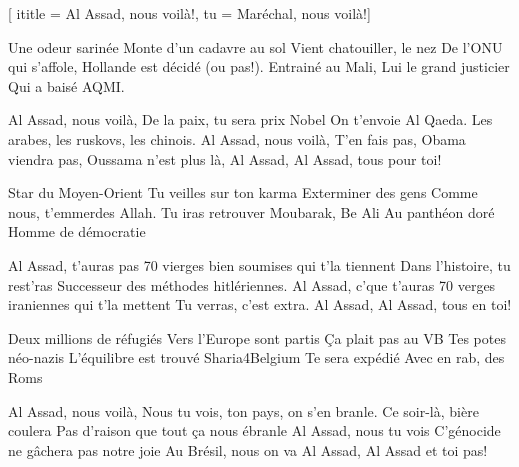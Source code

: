  [
ititle = {Al Assad, nous voilà!},
tu = {Maréchal, nous voilà!}]


\beginverse
Une odeur sarinée
Monte d'un cadavre au sol
Vient chatouiller, le nez
De l'ONU qui s'affole,
Hollande est décidé (ou pas!).
Entrainé au Mali,
Lui le grand justicier
Qui a baisé AQMI.
\endverse

\beginchorus
Al Assad, nous voilà,
De la paix, tu sera prix Nobel
On t'envoie Al Qaeda.
Les arabes, les ruskovs, les chinois.
Al Assad, nous voilà,
T'en fais pas, Obama viendra pas,
Oussama n'est plus là,
Al Assad, Al Assad, tous pour toi!
\endchorus

\beginverse
Star du Moyen-Orient
Tu veilles sur ton karma
Exterminer des gens
Comme nous, t'emmerdes
Allah. Tu iras retrouver
Moubarak, Be Ali
Au panthéon doré
Homme de démocratie
\endverse

\beginchorus
Al Assad, t'auras pas
70 vierges bien soumises qui t'la tiennent
Dans l'histoire, tu rest'ras
Successeur des méthodes hitlériennes.
Al Assad, c'que t'auras
70 verges iraniennes qui t'la mettent
Tu verras, c'est extra.
Al Assad, Al Assad, tous en toi!
\endchorus

\beginverse
Deux millions de réfugiés
Vers l'Europe sont partis
Ça plait pas au VB
Tes potes néo-nazis
L'équilibre est trouvé
Sharia4Belgium
Te sera expédié
Avec en rab, des Roms
\endverse

\beginchorus
Al Assad, nous voilà,
Nous tu vois, ton pays, on s'en branle.
Ce soir-là, bière coulera
Pas d'raison que tout ça nous ébranle
Al Assad, nous tu vois
C'génocide ne gâchera pas notre joie
Au Brésil, nous on va
Al Assad, Al Assad et toi pas!
\endchorus

\endsong